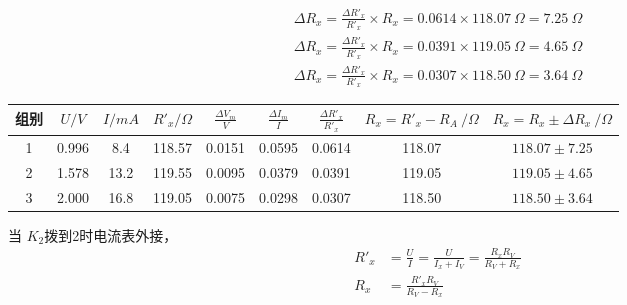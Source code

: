 \documentclass[UTF8]{ctexart}
\begin{document}
\begin{align*}
    \Delta R_x = \frac{\Delta R'_x}{R'_x} \times R_x = 0.0614 \times 118.07 \ \Omega = 7.25 \ \Omega \\
    \Delta R_x = \frac{\Delta R'_x}{R'_x} \times R_x = 0.0391 \times 119.05 \ \Omega = 4.65 \ \Omega \\
    \Delta R_x = \frac{\Delta R'_x}{R'_x} \times R_x = 0.0307 \times 118.50 \ \Omega = 3.64 \ \Omega 
\end{align*}
\begin{table}[H]
    \centering
    \begin{tabular}{|c|c|c|c|c|c|c|c|c|}
    \hline
        组别 &  $U/V$  &  $I/mA$  &  $R'_x/\Omega$  & $\frac{\Delta V_m}{V}$  & $\frac{\Delta I_m}{I}$  &  $\frac{\Delta R'_x}{R'_x}$  &  $R_x = R'_x - R_A \ /\Omega$ &  $R_x = R_x \pm \Delta R_x \ /\Omega$\\
    \hline
         1   &  0.996  & 8.4  &  118.57  & 0.0151 &  0.0595  &  0.0614  & 118.07 &  $118.07 \pm 7.25 $ \\
    \hline
         2   &  1.578  & 13.2  &  119.55  & 0.0095 &  0.0379  &  0.0391  & 119.05 &  $119.05 \pm 4.65 $ \\
    \hline
         3   &  2.000  & 16.8  &  119.05  & 0.0075 &  0.0298  &  0.0307  & 118.50 &  $118.50 \pm 3.64 $  \\
    \hline
    \end{tabular}
\end{table}

当 $K_2$拨到2时电流表外接，
\begin{align*}
    R'_x &= \frac{U}{I} = \frac{U}{I_x + I_V} = \frac{R_xR_V}{R_V + R_x}\\
    R_x &= \frac{R'_xR_V}{R_V - R_x}
\end{align*}
\end{document}

